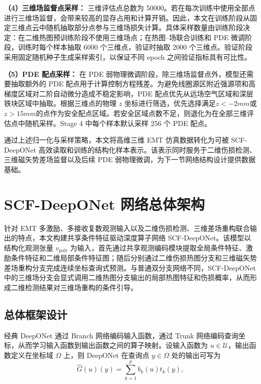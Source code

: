 \textbf{（4）三维场监督点采样：}
三维评估点总数为 50000。若在每次训练中使用全部点进行三维场监督，会带来较高的显存占用和计算开销。因此，本文在训练阶段从固定三维点云中随机抽取部分点参与三维场损失计算。具体采样数量由训练阶段决定：在二维热图预训练阶段不使用三维场点；在热图--场联合训练和 PDE 微调阶段，训练时每个样本抽取 6000 个三维点，验证时抽取 2000 个三维点。验证阶段采用固定随机种子生成采样索引，以保证不同 epoch 之间验证指标具有可比性。

\textbf{（5）PDE 配点采样：}
在 PDE 弱物理微调阶段，除三维场监督点外，模型还需要抽取额外的 PDE 配点用于计算控制方程残差。为避免线圈源区附近强源项和高梯度区域对二阶自动微分造成不稳定影响，PDE 配点优先从远场空气区域和深层铁块区域中抽取。根据三维点的物理 $z$ 坐标进行筛选，优先选择满足$z<-2 mm$或$z>15 mm$的点作为安全配点区域。若安全区域点数不足，则退化为在全部三维评估点中随机采样。Stage 4 中每个样本默认采样 256 个 PDE 配点。

通过上述归一化与采样策略，本文将高维三维 EMT 仿真数据转化为可被 SCF-DeepONet 高效读取和训练的结构化样本表示。该表示同时服务于二维伤损检测、三维磁矢势差场监督以及后续 PDE 弱物理微调，为下一节网络结构设计提供数据基础。

\section{SCF-DeepONet 网络总体架构}
\label{sec:scf_deeponet_architecture}

针对 EMT 多激励、多接收复数观测输入以及二维伤损检测、三维差场重构联合输出的特点，本文构建共享条件特征驱动深度算子网络 SCF-DeepONet。该模型以结构化观测张量 $v_{\mathrm{pair}}$ 为输入，首先通过共享观测编码模块提取全局条件特征、激励条件特征和二维局部条件特征图；随后分别通过二维伤损热图分支和三维磁矢势差场重构分支完成连续坐标查询式预测。与普通双分支网络不同，SCF-DeepONet 中的三维场分支会显式调用二维热图分支输出的局部热图特征和伤损概率，从而形成二维检测结果对三维场重构的条件引导。

\subsection{总体框架设计}
\label{subsec:overall_framework}

经典 DeepONet 通过 Branch 网络编码输入函数，通过 Trunk 网络编码查询坐标，从而学习输入函数到输出函数之间的算子映射。设输入函数为 $u\in\mathcal U$，输出函数定义在坐标域 $\Omega$ 上，则 DeepONet 在查询点 $y\in\Omega$ 处的输出可写为
\begin{equation}
\label{eq:deeponet_general}
\hat G(u)(y)
=
\sum_{k=1}^{p}
b_k(u)t_k(y),
\end{equation}

